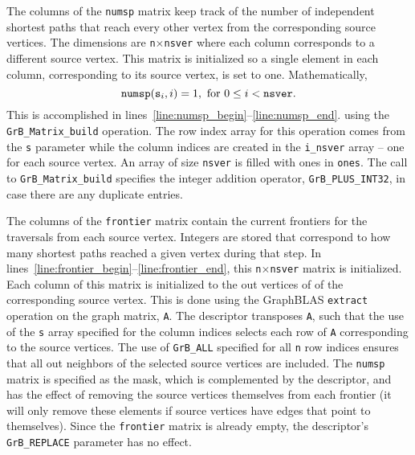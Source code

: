The columns of the {\tt numsp} matrix keep track of the number of independent 
shortest paths that reach every other vertex from the corresponding source 
vertices.  The dimensions are {\tt n}$\times${\tt nsver} where each column corresponds
to a different source vertex.  This matrix is initialized so a single
element in each column, corresponding to its source vertex, 
is set to one.  Mathematically,
\begin{equation}
	{\tt numsp}({{\tt s}_i},i) = 1, \text{ for }  0 \leq i < {\tt nsver}.
\end{equation}
This is accomplished in lines~\ref{line:numsp_begin}--\ref{line:numsp_end}.
using the {\tt GrB\_Matrix\_build} operation.  The row index array for this operation comes from 
the {\tt s} parameter while the column indices are created in the {\tt i\_nsver}
array -- one for each source vertex.  An array of size {\tt nsver} is filled 
with ones in {\tt ones}.  The call to {\tt GrB\_Matrix\_build} 
specifies the integer addition operator, {\tt GrB\_PLUS\_INT32}, in case there are any
duplicate entries.

The columns of the {\tt frontier} matrix contain the current frontiers for the
traversals from each source vertex.  Integers are stored that correspond to how
many shortest paths reached a given vertex during that step. 
In lines~\ref{line:frontier_begin}--\ref{line:frontier_end}, this
{\tt n}$\times${\tt nsver} matrix is initialized.  Each column of this 
matrix is initialized to the out vertices of of the corresponding source
vertex.  This 
is done using the GraphBLAS {\tt extract}
operation on the graph matrix, {\tt A}.  The descriptor transposes {\tt A}, such that
the use of the {\tt s} array specified for the column indices selects
each row of {\tt A} corresponding to the source vertices.
The use of {\tt GrB\_ALL} specified for all {\tt n} row indices 
ensures that all out neighbors of the selected source vertices are included.  
The {\tt numsp} matrix
is specified as the mask, which is complemented by the descriptor, and has the
effect of removing the source vertices themselves from 
each frontier (it will only remove these elements if source vertices have edges that point
to themselves).  Since the {\tt frontier} matrix is already empty, the 
descriptor's {\tt GrB\_REPLACE} parameter has no effect.

